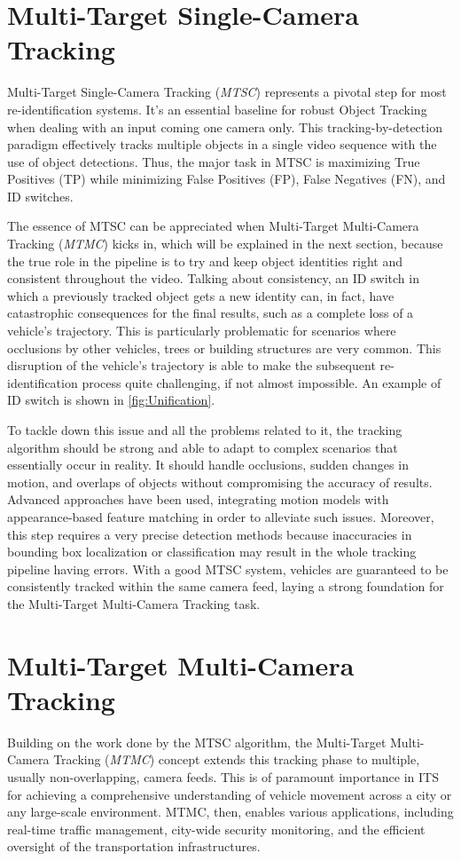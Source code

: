 \section{Multi-Target Single-Camera Tracking}
Multi-Target Single-Camera Tracking (\textit{MTSC}) \cite{RealTimeMultiObjectTracking, FairMOT} represents a pivotal step for most re-identification systems. It's an essential baseline for robust Object Tracking when dealing with an input coming one camera only. This tracking-by-detection paradigm effectively tracks multiple objects in a single video sequence with the use of object detections. Thus, the major task in MTSC is maximizing True Positives (TP) while minimizing False Positives (FP), False Negatives (FN), and ID switches.

The essence of MTSC can be appreciated when Multi-Target Multi-Camera Tracking (\textit{MTMC}) kicks in, which will be explained in the next section, because the true role in the pipeline is to try and keep object identities right and consistent throughout the video. Talking about consistency, an ID switch in which a previously tracked object gets a new identity can, in fact, have catastrophic consequences for the final results, such as a complete loss of a vehicle's trajectory. This is particularly problematic for scenarios where occlusions by other vehicles, trees or building structures are very common. This disruption of the vehicle's trajectory is able to make the subsequent re-identification process quite challenging, if not almost impossible. An example of ID switch is shown in \ref{fig:Unification}.

To tackle down this issue and all the problems related to it, the tracking algorithm should be strong and able to adapt to complex scenarios that essentially occur in reality. It should handle occlusions, sudden changes in motion, and overlaps of objects without compromising the accuracy of results. Advanced approaches have been used, integrating motion models with appearance-based feature matching in order to alleviate such issues. Moreover, this step requires a very precise detection methods because inaccuracies in bounding box localization or classification may result in the whole tracking pipeline having errors. With a good MTSC system, vehicles are guaranteed to be consistently tracked within the same camera feed, laying a strong foundation for the Multi-Target Multi-Camera Tracking task.

\section{Multi-Target Multi-Camera Tracking}
Building on the work done by the MTSC algorithm, the Multi-Target Multi-Camera Tracking (\textit{MTMC}) \cite{He2019MultiCameraVT, MTMCTrajectoryBased1, pahel2019VehicleRA, ELECTRICITY} concept extends this tracking phase to multiple, usually non-overlapping, camera feeds. This is of paramount importance in ITS for achieving a comprehensive understanding of vehicle movement across a city or any large-scale environment. MTMC, then, enables various applications, including real-time traffic management, city-wide security monitoring, and the efficient oversight of the transportation infrastructures.

